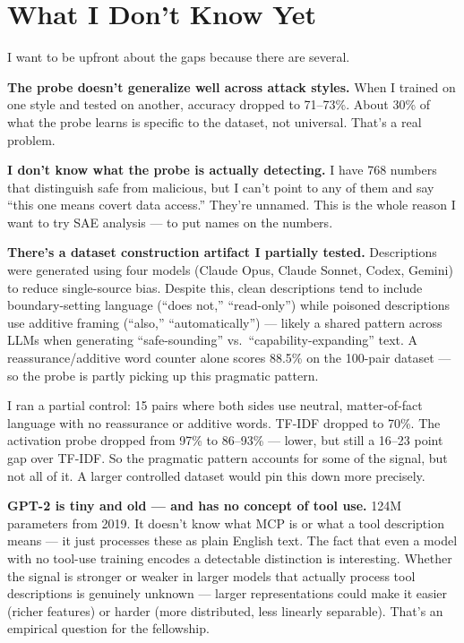 \documentclass[11pt]{article}
\begin{document}
\section{What I Don't Know Yet}
\label{sec:limitations}

I want to be upfront about the gaps because there are several.

\textbf{The probe doesn't generalize well across attack styles.} When I trained on one style and tested on another, accuracy dropped to 71--73\%. About 30\% of what the probe learns is specific to the dataset, not universal. That's a real problem.

\textbf{I don't know what the probe is actually detecting.} I have 768 numbers that distinguish safe from malicious, but I can't point to any of them and say ``this one means covert data access.'' They're unnamed. This is the whole reason I want to try SAE analysis --- to put names on the numbers.

\textbf{There's a dataset construction artifact I partially tested.} Descriptions were generated using four models (Claude Opus, Claude Sonnet, Codex, Gemini) to reduce single-source bias. Despite this, clean descriptions tend to include boundary-setting language (``does not,'' ``read-only'') while poisoned descriptions use additive framing (``also,'' ``automatically'') --- likely a shared pattern across LLMs when generating ``safe-sounding'' vs.\ ``capability-expanding'' text. A reassurance/additive word counter alone scores 88.5\% on the 100-pair dataset --- so the probe is partly picking up this pragmatic pattern.

I ran a partial control: 15 pairs where both sides use neutral, matter-of-fact language with no reassurance or additive words. TF-IDF dropped to 70\%. The activation probe dropped from 97\% to 86--93\% --- lower, but still a 16--23 point gap over TF-IDF. So the pragmatic pattern accounts for some of the signal, but not all of it. A larger controlled dataset would pin this down more precisely.

\textbf{GPT-2 is tiny and old --- and has no concept of tool use.} 124M parameters from 2019. It doesn't know what MCP is or what a tool description means --- it just processes these as plain English text. The fact that even a model with no tool-use training encodes a detectable distinction is interesting. Whether the signal is stronger or weaker in larger models that actually process tool descriptions is genuinely unknown --- larger representations could make it easier (richer features) or harder (more distributed, less linearly separable). That's an empirical question for the fellowship.
\end{document}
